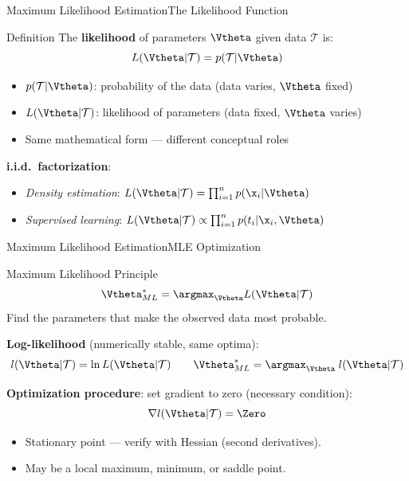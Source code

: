\begin{frame}{Maximum Likelihood Estimation}{The Likelihood Function}
  \begin{block}{Definition}
    The \textbf{likelihood} of parameters $\Vtheta$ given data $\mathcal{T}$ is:
    \[
      L(\Vtheta|\mathcal{T}) = p(\mathcal{T}|\Vtheta)
    \]
    \begin{itemize}
      \item $p(\mathcal{T}|\Vtheta)$: probability of the data (data varies, $\Vtheta$ fixed)
      \item $L(\Vtheta|\mathcal{T})$: likelihood of parameters (data fixed, $\Vtheta$ varies)
      \item Same mathematical form — different conceptual roles
    \end{itemize}
  \end{block}

  \textbf{i.i.d.\ factorization}:
  \begin{itemize}
    \item \textit{Density estimation}: $L(\Vtheta|\mathcal{T}) = \prod_{i=1}^n p(\x_i|\Vtheta)$
    \item \textit{Supervised learning}: $L(\Vtheta|\mathcal{T}) \propto \prod_{i=1}^n p(t_i|\x_i,\Vtheta)$
  \end{itemize}
\end{frame}

\begin{frame}{Maximum Likelihood Estimation}{MLE Optimization}
  \begin{block}{Maximum Likelihood Principle}
    \[
      \Vtheta^*_{ML} = \argmax_{\Vtheta} L(\Vtheta|\mathcal{T})
    \]
    Find the parameters that make the observed data most probable.
  \end{block}

  \textbf{Log-likelihood} (numerically stable, same optima):
  \[
    l(\Vtheta|\mathcal{T}) = \ln L(\Vtheta|\mathcal{T}) \qquad \Vtheta^*_{ML} = \argmax_{\Vtheta}\; l(\Vtheta|\mathcal{T})
  \]

  \textbf{Optimization procedure}: set gradient to zero (necessary condition):
  \[
    \nabla l(\Vtheta|\mathcal{T}) = \Zero
  \]

  \begin{itemize}
    \item Stationary point — verify with Hessian (second derivatives).
    \item May be a local maximum, minimum, or saddle point.
  \end{itemize}
\end{frame}

